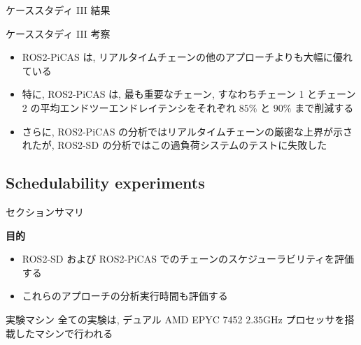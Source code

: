 \begin{frame}{ケーススタディ III 結果}
\end{frame}

\begin{frame}{ケーススタディ III 考察}
    \begin{itemize}
        \item ROS2-PiCAS は, リアルタイムチェーンの他のアプローチよりも大幅に優れている
        \item 特に, ROS2-PiCAS は, 最も重要なチェーン, すなわちチェーン 1 とチェーン 2 の平均エンドツーエンドレイテンシをそれぞれ $85 \%$ と $90 \%$ まで削減する
        \item さらに, ROS2-PiCAS の分析ではリアルタイムチェーンの厳密な上界が示されたが, ROS2-SD の分析ではこの過負荷システムのテストに失敗した
    \end{itemize}
\end{frame}



\subsection{Schedulability experiments}
\label{ssec: schedulability experiments}

\begin{frame}{セクションサマリ}
    \begin{itembox}[l]{\textbf{目的}}
        \begin{itemize}
            \item ROS2-SD および ROS2-PiCAS でのチェーンのスケジューラビリティを評価する
            \item これらのアプローチの分析実行時間も評価する
        \end{itemize}
    \end{itembox}
\end{frame}

\begin{frame}{実験マシン}
    全ての実験は, デュアル AMD EPYC 7452 $2.35 \mathrm{GHz}$ プロセッサを搭載したマシンで行われる
\end{frame}

